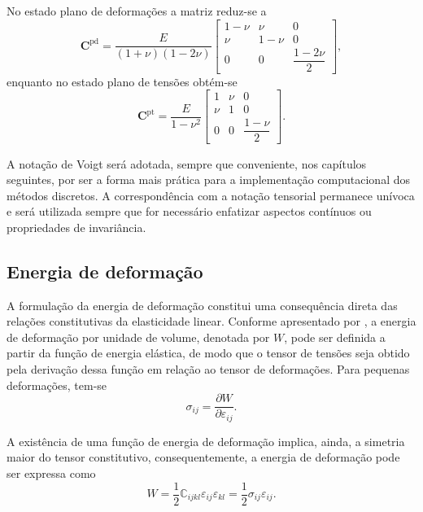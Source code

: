 \noindent No estado plano de deformações a matriz reduz-se a
\begin{equation}
    \mathbf{C}^{\text{pd}} =
    \frac{E}{(1+\nu)(1-2\nu)}
    \begin{bmatrix}
        1-\nu & \nu & 0 \\
        \nu & 1-\nu & 0 \\
        0 & 0 & \dfrac{1-2\nu}{2}
    \end{bmatrix},
    \label{eq:3.31}
\end{equation}
\noindent enquanto no estado plano de tensões obtém-se
\begin{equation}
    \mathbf{C}^{\text{pt}} =
    \frac{E}{1-\nu^2}
    \begin{bmatrix}
        1 & \nu & 0 \\
        \nu & 1 & 0 \\
        0 & 0 & \dfrac{1-\nu}{2}
    \end{bmatrix}.
    \label{eq:3.32}
\end{equation}

\indent A notação de Voigt será adotada, sempre que conveniente, nos capítulos seguintes, por ser a forma mais prática para a implementação computacional dos métodos discretos. A correspondência com a notação tensorial permanece unívoca e será utilizada sempre que for necessário enfatizar aspectos contínuos ou propriedades de invariância.

\subsection{Energia de deformação}

\indent A formulação da energia de deformação constitui uma consequência direta das relações constitutivas da elasticidade linear. Conforme apresentado por \citet{continuummechanicsengineers2010}, a energia de deformação por unidade de volume, denotada por $W$, pode ser definida a partir da função de energia elástica, de modo que o tensor de tensões seja obtido pela derivação dessa função em relação ao tensor de deformações. Para pequenas deformações, tem-se
\begin{equation}
    \sigma_{ij}=\frac{\partial W}{\partial \varepsilon_{ij}}.
    \label{eq:3.a2}
\end{equation}

\indent A existência de uma função de energia de deformação implica, ainda, a simetria maior do tensor constitutivo, consequentemente, a energia de deformação pode ser expressa como
\begin{equation}
    W=\frac{1}{2}\mathbb{C}_{ijkl}\varepsilon_{ij}\varepsilon_{kl}=\frac{1}{2}\sigma_{ij}\varepsilon_{ij}.
    \label{eq:3.a3}
\end{equation}

